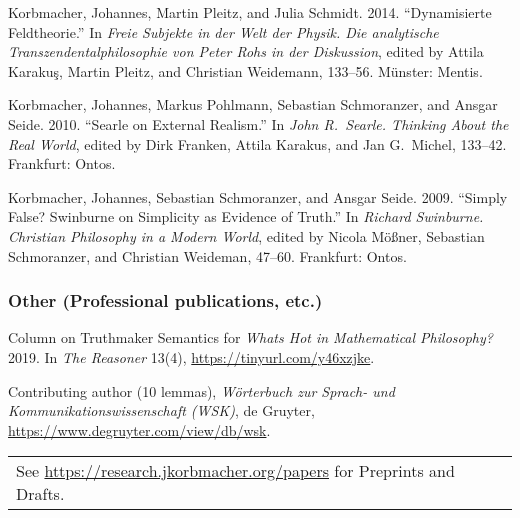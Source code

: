 \begin{etaremune}
  \item Korbmacher, Johannes, Martin Pleitz, and Julia Schmidt. 2014. ``Dynamisierte Feldtheorie.'' In \emph{Freie Subjekte in der Welt der Physik. Die analytische Transzendentalphilosophie von Peter Rohs in der Diskussion}, edited by Attila Karaku\c{s}, Martin Pleitz, and Christian Weidemann, 133--56. M\"unster: Mentis.
  \item Korbmacher, Johannes, Markus Pohlmann, Sebastian Schmoranzer, and Ansgar Seide. 2010. ``Searle on External Realism.'' In \emph{John R.\ Searle. Thinking About the Real World}, edited by Dirk Franken, Attila Karakus, and Jan G.\ Michel, 133--42. Frankfurt: Ontos.
  \item Korbmacher, Johannes, Sebastian Schmoranzer, and Ansgar Seide. 2009. ``Simply False? Swinburne on Simplicity as Evidence of Truth.'' In \emph{Richard Swinburne. Christian Philosophy in a Modern World}, edited by Nicola M\"o\ss ner, Sebastian Schmoranzer, and Christian Weideman, 47--60. Frankfurt: Ontos.
\end{etaremune}
\subsubsection*{Other (Professional publications, etc.)}
\begin{etaremune}
  \item Column on Truthmaker Semantics for \emph{Whats Hot in Mathematical Philosophy?} 2019. In \emph{The Reasoner} 13(4), \url{https://tinyurl.com/y46xzjke}.
  \item Contributing author (10 lemmas), \emph{W\"orterbuch zur Sprach- und Kommunikationswissenschaft (WSK)}, de Gruyter, \url{https://www.degruyter.com/view/db/wsk}.
\end{etaremune} \vspace{1ex}
\begin{tabular}{l} See \url{https://research.jkorbmacher.org/papers} for Preprints and Drafts.
\end{tabular}
